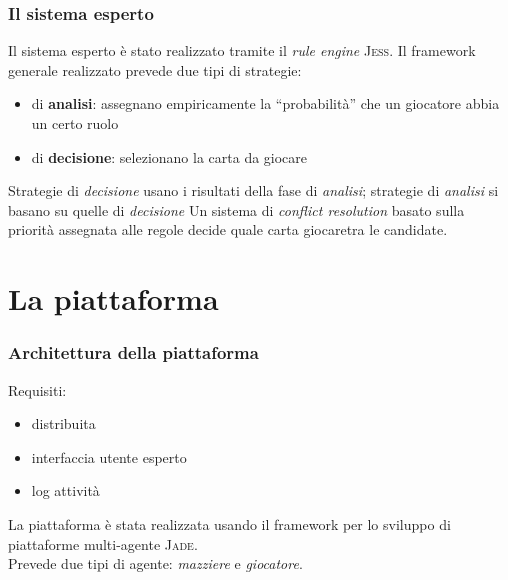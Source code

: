 \documentclass{beamer}
\newcommand*\lista{\item[$\diamondsuit$]}
\begin{document}


\begin{frame}
   \frametitle{Il sistema esperto}
   Il sistema esperto è stato realizzato tramite il \emph{rule engine} \textsc{Jess}.
   \vfill
   \pause
   Il framework generale realizzato prevede due tipi di strategie:
   \begin{itemize}
      \lista di \textbf{analisi}: assegnano empiricamente la ``probabilità'' che un giocatore abbia un certo ruolo
      \lista di \textbf{decisione}: selezionano la carta da giocare
   \end{itemize}
   \vfill
   \pause
   Strategie di \emph{decisione} usano i risultati della fase di \emph{analisi}; strategie di \emph{analisi} si basano su quelle di \emph{decisione}
   \vfill
   \pause
   Un sistema di \emph{conflict resolution} basato sulla priorità assegnata alle regole decide quale carta giocaretra le candidate.
\end{frame}


\section{La piattaforma}

\begin{frame}
   \frametitle{Architettura della piattaforma}
   \vfill
   Requisiti:
   \begin{itemize}
      \lista distribuita
      \lista interfaccia utente esperto
      \lista log attività
   \end{itemize}
   \vfill   
   \pause
   La piattaforma è stata realizzata usando il framework per lo sviluppo di piattaforme multi-agente \textsc{Jade}.\\
   Prevede due tipi di agente: \emph{mazziere} e \emph{giocatore}.
\end{frame}

\end{document}
